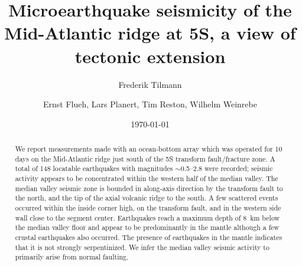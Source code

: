 \documentclass[aguplus]{aguplus}
\begin{document}
\title{Microearthquake seismicity of the Mid-Atlantic ridge at
 5\dg S, a view of tectonic extension}
\author{Frederik Tilmann}
\author{Ernst Flueh, Lars Planert, Tim Reston, Wilhelm Weinrebe}
\date{\today}

\begin{abstract}

We report measurements made with an ocean-bottom array which was
operated for 10 days on the
Mid-Atlantic ridge just south of the 5\dg S transform fault/fracture
zone.  A total of 148 locatable earthquakes with magnitudes $\sim$0.5--2.8 were recorded;
seismic activity appears to be concentrated within the western
half of the median valley.  The median valley seismic zone is bounded
in along-axis direction by the transform fault to the
north, and the tip of the axial volcanic ridge to the south.  A few
scattered events occurred within the inside corner high, on the
transform fault, and in the western side wall close to the segment
center. Earthquakes reach a maximum depth of 8~km below the median
valley floor and appear to be predominantly in the mantle although a
few crustal earthquakes also occurred.  The presence of
earthquakes in the mantle indicates that it is not strongly
serpentinized. We infer the median valley
seismic activity to primarily arise from normal faulting.
\end{abstract}
\end{document}

